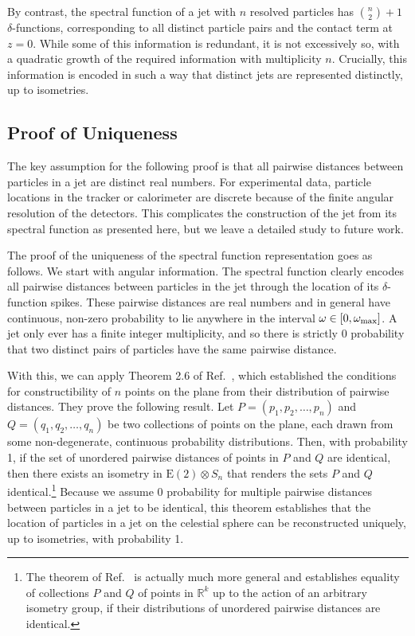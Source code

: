 \documentclass[letterpaper,11pt]{article}
\DeclareRobustCommand{\InRef}[1]{Ref.~\cite{#1}}
\begin{document}
By contrast, the spectral function of a jet with $n$ resolved particles has ${n\choose 2}+1$ $\delta$-functions, corresponding to all distinct particle pairs and the contact term at $z=0$.
%
While some of this information is redundant, it is not excessively so, with a quadratic growth of the required information with multiplicity $n$.
%
Crucially, this information is encoded in such a way that distinct jets are represented distinctly, up to isometries.


\subsection{Proof of Uniqueness}


The key assumption for the following proof is that all pairwise distances between particles in a jet are distinct real numbers.
%
For experimental data, particle locations in the tracker or calorimeter are discrete because of the finite angular resolution of the detectors.
%
This complicates the construction of the jet from its spectral function as presented here, but we leave a detailed study to future work.


The proof of the uniqueness of the spectral function representation goes as follows.
%
We start with angular information.
%
The spectral function clearly encodes all pairwise distances between particles in the jet through the location of its $\delta$-function spikes.
%
These pairwise distances are real numbers and in general have continuous, non-zero probability to lie anywhere in the interval $\omega \in [0,\omega_{\rm max}]$.
%
A jet only ever has a finite integer multiplicity, and so there is strictly 0 probability that two distinct pairs of particles have the same pairwise distance.


With this, we can apply Theorem 2.6 of \InRef{BOUTIN2004709}, which established the conditions for constructibility of $n$ points on the plane from their distribution of pairwise distances.
%
They prove the following result.
%
Let $P=(p_1,p_2,\dotsc,p_n)$ and $Q=(q_1,q_2,\dotsc,q_n)$ be two collections of points on the plane, each drawn from some non-degenerate, continuous probability distributions.
%
Then, with probability 1, if the set of unordered pairwise distances of points in $P$ and $Q$ are identical, then there exists an isometry in $\text{E}(2)\otimes S_n$ that renders the sets $P$ and $Q$ identical.\footnote{The theorem of \InRef{BOUTIN2004709} is actually much more general and establishes equality of collections $P$ and $Q$ of points in $\mathbb{R}^k$ up to the action of an arbitrary isometry group, if their distributions of unordered pairwise distances are identical.}
%
Because we assume 0 probability for multiple pairwise distances between particles in a jet to be identical, this theorem establishes that the location of particles in a jet on the celestial sphere can be reconstructed uniquely, up to isometries, with probability 1.
\end{document}

